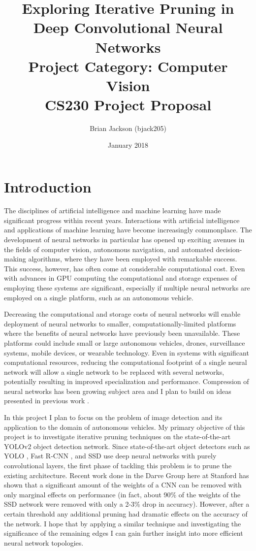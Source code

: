 \documentclass[10pt,letterpaper]{article}
\title{Exploring Iterative Pruning in Deep Convolutional Neural Networks \\
	\large Project Category: Computer Vision \\ 
	CS230 Project Proposal\\
}
\author{Brian Jackson (bjack205)}
\date{January 2018}
\begin{document}
	\maketitle
	
	\section{Introduction}
	The disciplines of artificial intelligence and machine learning have made significant progress within recent years. Interactions with artificial intelligence and applications of machine learning have become increasingly commonplace. The development of neural networks in particular has opened up exciting avenues in the fields of computer vision, autonomous navigation, and automated decision-making algorithms, where they have been employed with remarkable success. This success, however, has often come at considerable computational cost. Even with advances in GPU computing the computational and storage expenses of employing these systems are significant, especially if multiple neural networks are employed on a single platform, such as an autonomous vehicle. 
	
	Decreasing the computational and storage costs of neural networks will enable deployment of neural networks to smaller, computationally-limited platforms where the benefits of neural networks have previously been unavailable. These platforms could include small or large autonomous vehicles, drones, surveillance systems, mobile devices, or wearable technology. Even in systems with significant computational resources, reducing the computational footprint of a single neural network will allow a single network to be replaced with several networks, potentially resulting in improved specialization and performance. Compression of neural networks has been growing subject area and I plan to build on ideas presented in previous work \cite{Novikov2015,V.Oseledets2011,Han2015}. 
	
	In this project I plan to focus on the problem of image detection and its application to the domain of autonomous vehicles. My primary objective of this project is to investigate iterative pruning techniques on the state-of-the-art YOLOv2 object detection network. Since state-of-the-art object detectors such as YOLO \cite{Redmon2015,Redmon2016}, Fast R-CNN \cite{Girshick2015}, and SSD \cite{Liu2016} use deep neural networks with purely convolutional layers, the first phase of tackling this problem is to prune the existing architecture. Recent work done in the Darve Group here at Stanford has shown that a significant amount of the weights of a CNN can be removed with only marginal effects on performance (in fact, about 90\% of the weights of the SSD network were removed with only a 2-3\% drop in accuracy). However, after a certain threshold any additional pruning had dramatic effects on the accuracy of the network. I hope that by applying a similar technique and investigating the significance of the remaining edges I can gain further insight into more efficient neural network topologies. 
	
\end{document}
